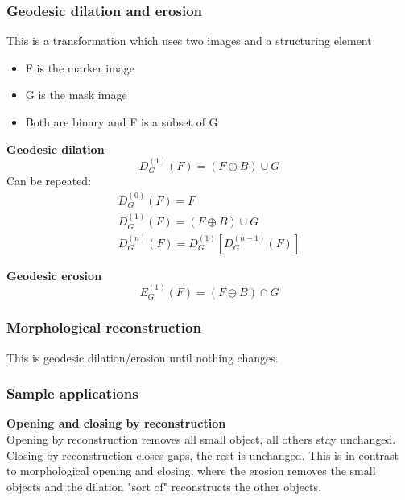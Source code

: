 \subsubsection{Geodesic dilation and erosion}
This is a transformation which uses two images and a structuring element
\begin{itemize}
\item F is the marker image
\item G is the mask image
\item Both are binary and F is a subset of G
\end{itemize}
\textbf{Geodesic dilation}
\[
	D_G^{(1)}(F) = (F\oplus B)\cup G
\]
Can be repeated:
\begin{align*}
	D_G^{(0)}(F) = F \\
	D_G^{(1)}(F) = (F\oplus B)\cup G\\
	D_G^{(n)}(F) = D_G^{(1)}[D_G^{(n-1)}(F)]
\end{align*}

\textbf{Geodesic erosion}
\[
	E_G^{(1)}(F) = (F\ominus B)\cap G
\]

\subsubsection{Morphological reconstruction}
This is geodesic dilation/erosion until nothing changes.

\subsubsection{Sample applications}
\textbf{Opening and closing by reconstruction}\\
Opening by reconstruction removes all small object, all others stay unchanged.
Closing by reconstruction closes gaps, the rest is unchanged. This is in contrast to morphological opening and closing, where the erosion removes the small objects and the dilation "sort of" reconstructs the other objects.\\

